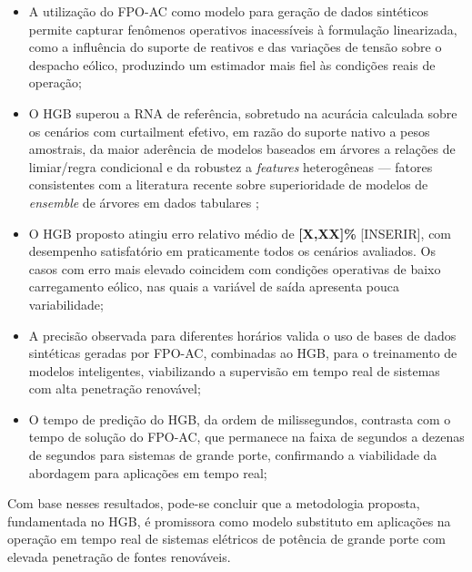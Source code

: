 \documentclass[conference]{IEEEtran}
\begin{document}
\begin{itemize}
    \item A utilização do FPO-AC como modelo para geração de dados
    sintéticos permite capturar fenômenos operativos inacessíveis à
    formulação linearizada, como a influência do suporte de reativos e das variações de tensão sobre o despacho eólico, produzindo um estimador mais fiel às condições reais de operação;

    \item O HGB superou a RNA de referência, sobretudo na acurácia
    calculada sobre os cenários com curtailment efetivo, em razão do
    suporte nativo a pesos amostrais, da maior aderência de modelos
    baseados em árvores a relações de limiar/regra condicional e da
    robustez a \textit{features} heterogêneas — fatores consistentes com
    a literatura recente sobre superioridade de modelos de \textit{ensemble} de árvores em dados tabulares \cite{grinsztajn2022tree};

    \item O HGB proposto atingiu erro relativo médio de \textbf{[X,XX]\%}
    [INSERIR], com desempenho satisfatório em praticamente todos os cenários avaliados. Os casos com erro mais elevado coincidem com condições operativas de baixo carregamento eólico, nas quais a variável de saída apresenta pouca variabilidade;

    \item A precisão observada para diferentes horários valida o uso de bases de dados sintéticas geradas por FPO-AC, combinadas ao HGB, para
    o treinamento de modelos inteligentes, viabilizando a supervisão em tempo real de sistemas com alta penetração renovável;

    \item O tempo de predição do HGB, da ordem de milissegundos, contrasta com o tempo de solução do FPO-AC, que permanece na faixa de segundos a dezenas de segundos para sistemas de grande porte, confirmando a
    viabilidade da abordagem para aplicações em tempo real;

\end{itemize}

Com base nesses resultados, pode-se concluir que a metodologia proposta,
fundamentada no HGB, é promissora como modelo substituto em aplicações na operação em tempo real de sistemas elétricos
de potência de grande porte com elevada penetração de fontes renováveis.
\end{document}
